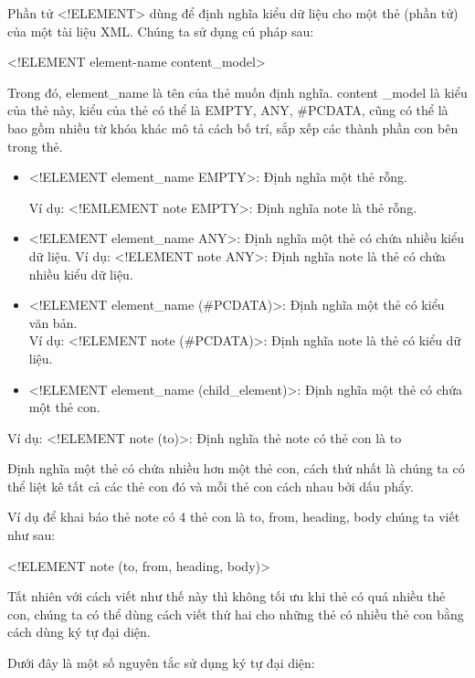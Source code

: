 Phần tử  {\ttfamily <!ELEMENT> }dùng để định nghĩa kiểu dữ liệu cho một thẻ (phần tử) của một tài liệu XML. Chúng ta sử dụng cú pháp sau:
\begin{center}
 {\ttfamily  <!ELEMENT element-name content\_model> } 
\end{center}

Trong đó,  {\ttfamily  element\_name} là tên của thẻ muốn định nghĩa. {\ttfamily content \_model } là kiểu của thẻ này, kiểu của thẻ có thể là  {\ttfamily EMPTY, ANY, \#PCDATA}, cũng có thể là bao gồm nhiều từ khóa khác mô tả cách bố trí, sắp xếp các thành phần con bên trong thẻ.

 \begin{itemize}
 \item
{\ttfamily <!ELEMENT element\_name EMPTY>}: Định nghĩa một thẻ rỗng.

Ví dụ:  {\ttfamily <!EMLEMENT note EMPTY>}: Định nghĩa note là thẻ rỗng.
\item	 {\ttfamily <!ELEMENT element\_name ANY>}: Định nghĩa một thẻ có chứa nhiều kiểu dữ liệu.
Ví dụ:  {\ttfamily <!ELEMENT note ANY>}: Định nghĩa note là thẻ có chứa nhiều kiểu dữ liệu.
\item	  {\ttfamily <!ELEMENT element\_name (\#PCDATA)>}: Định nghĩa một thẻ có kiểu văn bản.\\ 
  Ví dụ:  {\ttfamily <!ELEMENT note (\#PCDATA)>}: Định nghĩa note là thẻ có kiểu dữ liệu.
\item	   {\ttfamily <!ELEMENT element\_name (child\_element)>}: Định nghĩa một thẻ có chứa một thẻ con.
 \end{itemize}
 
 Ví dụ:  {\ttfamily <!ELEMENT note (to)>}: Định nghĩa thẻ note có thẻ con là {\ttfamily to}
  
 Định nghĩa một thẻ có chứa nhiều hơn một thẻ con, cách thứ nhất là chúng ta có thể liệt kê tất cả các thẻ con đó và mỗi thẻ con cách nhau bởi dấu phẩy.
 
  	Ví dụ để khai báo thẻ note có 4 thẻ con là {\ttfamily to, from, heading, body} chúng ta viết như sau:
  	
   {\ttfamily 	<!ELEMENT note (to, from, heading, body)>}
   
  	Tất nhiên với cách viết như thế này thì không tối ưu khi thẻ  có quá nhiều thẻ con, chúng ta có thể dùng cách viết thứ hai cho những thẻ có nhiều thẻ con bằng cách dùng ký tự đại diện.
  	
  	Dưới đây là một số nguyên tắc sử dụng ký tự đại diện:
  	
